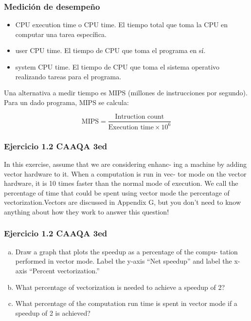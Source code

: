 \documentclass{beamer}
\begin{document}
\begin{frame}
\frametitle{Medición de desempeño}

\begin{itemize}
\item CPU execution time o CPU time. El tiempo total que toma la CPU en computar una tarea específica.
\item user CPU time. El tiempo de CPU que toma el programa en sí.
\item system CPU time. El tiempo de CPU que toma el sistema operativo realizando tareas para el programa.
\end{itemize}

\bigskip
Una alternativa a medir tiempo es MIPS (millones de instrucciones por segundo). Para un dado programa, MIPS se calcula:

\[ \text{MIPS} = \frac{\text{Intruction count}}{\text{Execution time} \times 10^6} \]  

\end{frame}


\begin{frame}
\frametitle{Ejercicio 1.2 CAAQA 3ed}
In this exercise, assume that we are considering enhanc- ing a machine by adding vector hardware to it. When a computation is run in vec- tor mode on the vector hardware, it is 10 times faster than the normal mode of execution. We call the percentage of time that could be spent using vector mode the percentage of vectorization.Vectors are discussed in Appendix G, but you don’t need to know anything about how they work to answer this question!
\end{frame}

\begin{frame}
\frametitle{Ejercicio 1.2 CAAQA 3ed}
\begin{enumerate}[a.]
\item Draw a graph that plots the speedup as a percentage of the compu- tation performed in vector mode. Label the y-axis “Net speedup” and label the x-axis “Percent vectorization.”
\item What percentage of vectorization is needed to achieve a speedup of 2?
\item What percentage of the computation run time is spent in vector mode if a speedup of 2 is achieved?
\end{enumerate}
\end{frame}
\end{document}
